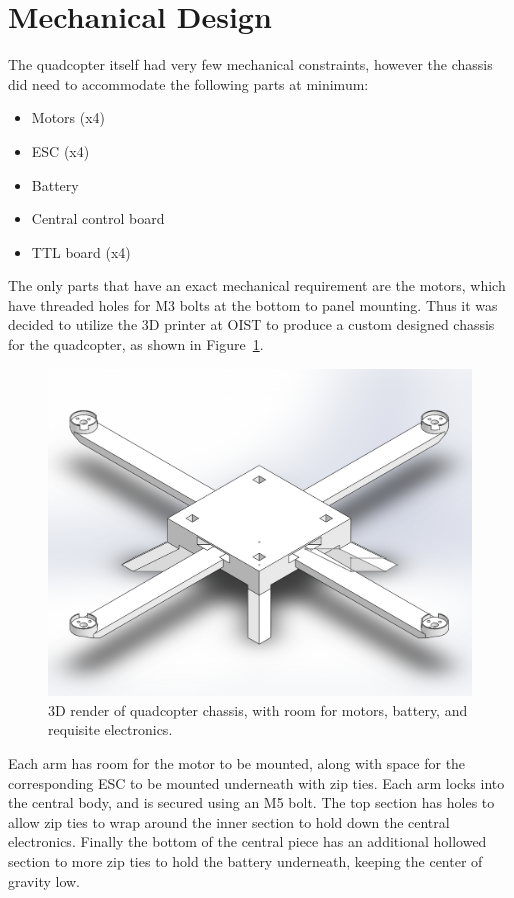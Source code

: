 \documentclass[11pt]{article} %
\begin{document}
\section{Mechanical Design}
The quadcopter itself had very few mechanical constraints, however the chassis did need to accommodate the following parts at minimum:
\begin{itemize}
\item Motors (x4)
\item ESC (x4)
\item Battery
\item Central control board
\item TTL board (x4)
\end{itemize}
The only parts that have an exact mechanical requirement are the motors, which have threaded holes for M3 bolts at the bottom to panel mounting. Thus it was decided to utilize the 3D printer at OIST to produce a custom designed chassis for the quadcopter, as shown in Figure~\ref{fig:chassis}.
\begin{figure}[h]
\centering
\includegraphics[width=\textwidth]{Quadcopter2D}
\caption{3D render of quadcopter chassis, with room for motors, battery, and requisite electronics.}
\label{fig:chassis}
\end{figure}
Each arm has room for the motor to be mounted, along with space for the corresponding ESC to be mounted underneath with zip ties. Each arm locks into the central body, and is secured using an M5 bolt. The top section has holes to allow zip ties to wrap around the inner section to hold down the central electronics. Finally the bottom of the central piece has an additional hollowed section to more zip ties to hold the battery underneath, keeping the center of gravity low.
\end{document}

